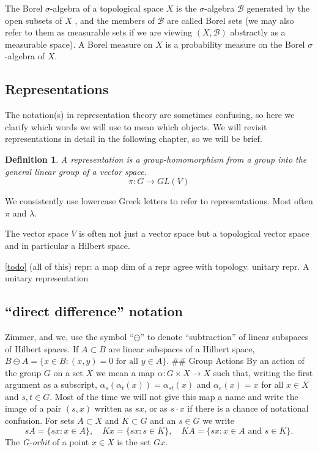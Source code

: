 \documentclass[
]{article}
\newtheorem{defn}{Definition}
\begin{document}
The Borel \(\sigma\)-algebra of a topological space \(X\) is the
\(\sigma\)-algebra \(\mathscr{B}\) generated by the open subsets of
\(X\) , and the members of \(\mathscr{B}\) are called Borel sets (we may
also refer to them as measurable sets if we are viewing
\((X, \mathscr{B})\) abstractly as a measurable space). A Borel measure
on \(X\) is a probability measure on the Borel \(\sigma\)-algebra of
\(X\).

\hypertarget{representations}{%
\subsection{Representations}\label{representations}}

The notation(s) in representation theory are sometimes confusing, so
here we clarify which words we will use to mean which objects. We will
revisit representations in detail in the following chapter, so we will
be brief.

  
\begin{defn}
A representation is a group-homomorphism from a group into the general linear group of a vector space.
$$
\pi: G \rightarrow GL(V)
$$
\end{defn}

We consistently use lowercase Greek letters to refer to representations.
Most often \(\pi\) and \(\lambda\).

The vector space \(V\) is often not just a vector space but a
topological vector space and in particular a Hilbert space.

\href{ergodicity}{{[}todo{]}} (all of this) repr: a map dim of a repr
agree with topology. unitary repr. A unitary representation

\hypertarget{direct-difference-notation}{%
\subsection{``direct difference''
notation}\label{direct-difference-notation}}

Zimmer, and we, use the symbol ``\(\ominus\)'' to denote ``subtraction''
of linear subspaces of Hilbert spaces. If \(A \subset B\) are linear
subspaces of a Hilbert space,
\(B \ominus A = \{x \in B: (x,y) = 0 \text{ for all }y \in A\}\). \#\#
Group Actions By an action of the group \(G\) on a set \(X\) we mean a
map \(\alpha: G \times X \rightarrow X\) such that, writing the first
argument as a subscript, \(\alpha_s(\alpha_t(x)) = \alpha_{st}(x)\) and
\(\alpha_e(x) = x\) for all \(x \in X\) and \(s, t \in G\). Most of the
time we will not give this map a name and write the image of a pair
\((s, x)\) written as \(sx\), or as \(s \cdot x\) if there is a chance
of notational confusion. For sets \(A \subset X\) and \(K \subset G\)
and an \(s \in G\) we write \[
s A = \{sx : x \in A\},
\quad
K x = \{sx : s \in K \},
\quad
K A = \{sx : x \in A \text{ and } s \in K \}.
\] The \emph{G-orbit} of a point \(x \in X\) is the set \(Gx\).
\end{document}
